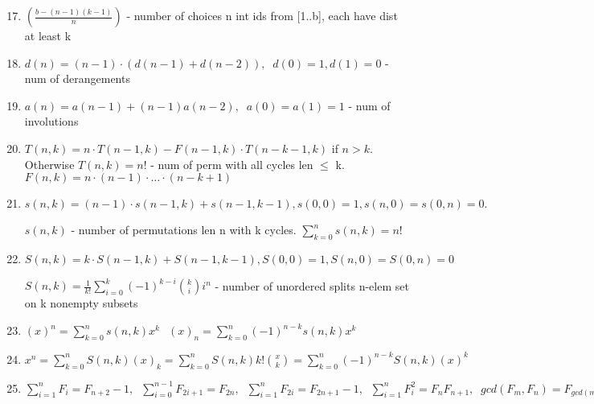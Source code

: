 \begin{large}
	\begin{enumerate}
		\setcounter{enumi}{16}
		\item $\left( \frac{b-(n-1)(k-1)}{n} \right)$ - number of choices n int ids from [1..b], each have dist at least k
		\item $d(n)=(n-1) \cdot (d(n-1)+d(n-2)),\;\; d(0)=1,d(1)=0$ - num of derangements
		\item $a(n)=a(n-1) + (n-1)a(n-2),\;\;a(0) = a(1) = 1$ - num of involutions
		\item $T(n, k)= n \cdot T(n-1, k) - F(n-1, k) \cdot T(n-k-1, k)$ if $n > k$. Otherwise $T(n,k)=n!$ - num of perm with all cycles len $\leq$ k. $F(n, k) = n \cdot (n - 1) \cdot … \cdot (n - k + 1)$
		\item $s(n,k)=(n-1) \cdot s(n-1,k)+s(n-1,k-1), s(0,0)=1,s(n,0)=s(0,n)=0.$ \par
		 $s(n,k)$ - number of permutations len n with k cycles. $\sum_{k=0}^{n}s(n,k) = n!$
		\item $S(n,k)=k \cdot S(n-1,k)+S(n-1,k-1), S(0,0)=1,S(n,0)=S(0,n)=0$ \par
		 $S(n,k) = \frac{1}{k!}\sum\limits_{i=0}^{k}(-1)^{k-i}{k \choose i}i^n$ - number of unordered splits n-elem set on k nonempty subsets
		\item $(x)^n = \sum\limits_{k=0}^{n}s(n,k)x^k\,\;\;
		(x)_n = \sum\limits_{k=0}^{n}(-1)^{n-k}s(n,k)x^k\,\;\;$
		\item $x^n = \sum\limits_{k=0}^{n}S(n,k)(x)_k = \sum\limits_{k=0}^{n}S(n,k)k!{x \choose k} = \sum\limits_{k=0}^{n}(-1)^{n-k}S(n,k)(x)^k$
		\item $\sum\limits_{i=1}^{n}F_i=F_{n+2}-1,\;\; \sum\limits_{i=0}^{n-1}F_{2i+1}=F_{2n},\;\; \sum\limits_{i=1}^{n}F_{2i}=F_{2n+1}-1,\;\;
		\sum\limits_{i=1}^{n}F_{i}^{2}=F_nF_{n+1},\;\;
		gcd(F_m, F_n)=F_{gcd(m, n)}$
	\end{enumerate}
\end{large}